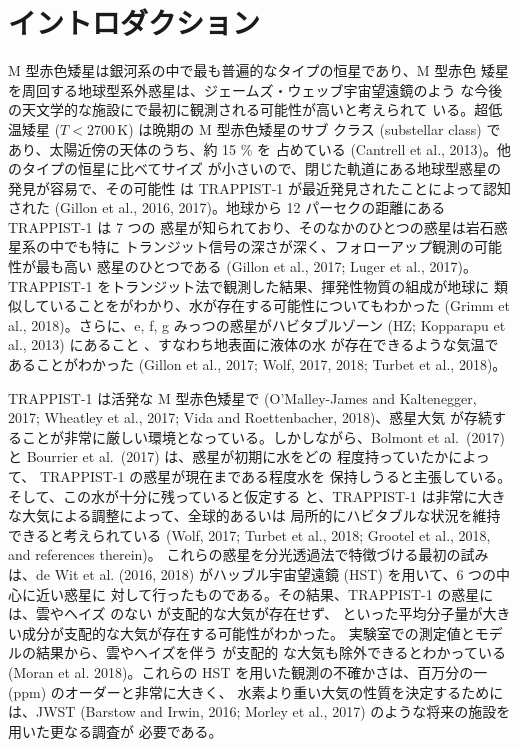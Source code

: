 \documentclass{dennou777}
\newcommand*\cec[1]{\cesplit{{\,\ }{\0}}{#1}}
\newcommand{\hmunit}[1]{\,\mathrm{#1}}
\begin{document}
\section{イントロダクション\label{intro}}
M 型赤色矮星は銀河系の中で最も普遍的なタイプの恒星であり、M 型赤色
矮星を周回する地球型系外惑星は、ジェームズ・ウェッブ宇宙望遠鏡のよう
な今後の天文学的な施設にで最初に観測される可能性が高いと考えられて
いる。超低温矮星 (\(T<2700\hmunit{K}\)) は晩期の M 型赤色矮星のサブ
クラス (substellar class) であり、太陽近傍の天体のうち、約 15 \% を
占めている (Cantrell et al., 2013)。他のタイプの恒星に比べてサイズ
が小さいので、閉じた軌道にある地球型惑星の発見が容易で、その可能性
は TRAPPIST-1 が最近発見されたことによって認知された (Gillon et al.,
2016, 2017)。地球から 12 パーセクの距離にある TRAPPIST-1 は 7 つの
惑星が知られており、そのなかのひとつの惑星は岩石惑星系の中でも特に
トランジット信号の深さが深く、フォローアップ観測の可能性が最も高い
惑星のひとつである (Gillon et al., 2017; Luger et al., 2017)。
TRAPPIST-1 をトランジット法で観測した結果、揮発性物質の組成が地球に
類似していることをがわかり、水が存在する可能性についてもわかった
(Grimm et al., 2018)。さらに、e, f, g みっつの惑星がハビタブルゾーン
(HZ; Kopparapu et al., 2013) にあること 、すなわち地表面に液体の水
が存在できるような気温であることがわかった (Gillon et al., 2017; Wolf,
2017, 2018; Turbet et al., 2018)。

TRAPPIST-1 は活発な M 型赤色矮星で (O'Malley-James and Kaltenegger,
2017; Wheatley et al., 2017; Vida and Roettenbacher, 2018)、惑星大気
が存続することが非常に厳しい環境となっている。しかしながら、Bolmont
et al.\ (2017) と Bourrier et al.\ (2017) は、惑星が初期に水をどの
程度持っていたかによって、 TRAPPIST-1 の惑星が現在まである程度水を
保持しうると主張している。そして、この水が十分に残っていると仮定する
と、TRAPPIST-1 は非常に大きな大気による調整によって、全球的あるいは
局所的にハビタブルな状況を維持できると考えられている (Wolf, 2017;
Turbet et al., 2018; Grootel et al., 2018, and references therein)。
これらの惑星を分光透過法で特徴づける最初の試みは、de Wit et al. (2016,
2018) がハッブル宇宙望遠鏡 (HST) を用いて、6 つの中心に近い惑星に
対して行ったものである。その結果、TRAPPIST-1 の惑星には、雲やヘイズ
のない  が支配的な大気が存在せず、\cec{N2, O2, H2O, CO2, CH4}
といった平均分子量が大きい成分が支配的な大気が存在する可能性がわかった。
実験室での測定値とモデルの結果から、雲やヘイズを伴う  が支配的
な大気も除外できるとわかっている (Moran et al. 2018)。これらの HST
を用いた観測の不確かさは、百万分の一 (ppm) のオーダーと非常に大きく、
水素より重い大気の性質を決定するためには、JWST (Barstow and Irwin,
2016; Morley et al., 2017) のような将来の施設を用いた更なる調査が
必要である。
\end{document}

